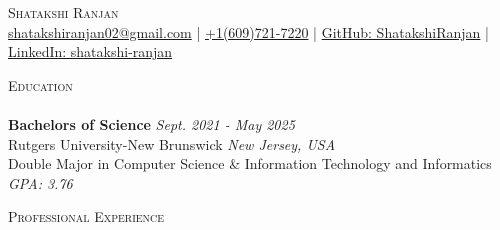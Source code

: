 \documentclass[a4paper]{article}
\newcommand{\lineunder} {
    \vspace*{-8pt} \\
    \hspace*{-18pt} \hrulefill \\
}
\newcommand{\header} [1] {
    {\hspace*{-18pt}\vspace*{6pt} \textsc{#1}}
    \vspace*{-6pt} \lineunder
}
\begin{document}
\vspace*{-35pt}

\begin{center}
{\Large \scshape Shatakshi Ranjan}\\
\vspace{2pt}
\small{ \href{mailto:shatakshiranjan02@gmail.com}{shatakshiranjan02@gmail.com}  | \href{tel:6097217220}{+1(609)721-7220} | \href{https://github.com/ShatakshiRanjan}{GitHub: ShatakshiRanjan}  | \href{https://www.linkedin.com/in/shatakshi-ranjan/}{LinkedIn: shatakshi-ranjan}}\\
\end{center}
\vspace{-4pt} 

%
%
\header{Education}
\textbf{Bachelors of Science}  \hfill \textit{Sept. 2021 - May 2025}\\
{\small
Rutgers University-New Brunswick \hfill \textit{New Jersey, USA}\\
Double Major in Computer Science \& Information Technology and Informatics
{\hfill \textit{GPA: 3.76}}\\
}
\vspace{0.5mm} 

%
%
\header{Professional Experience}
\end{document}
